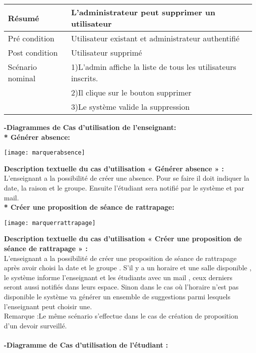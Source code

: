 \documentclass[a4paper,12pt,oneside]{report}
\begin{document}
\begin{center}

\begin{tabular}{|l|l|}
  \hline
  Résumé & L'administrateur peut supprimer un utilisateur \\
  \hline
  Pré condition & Utilisateur existant et administrateur authentifié \\
  \hline
  Post condition & Utilisateur supprimé\\
  \hline
 Scénario nominal & 1)L'admin affiche la liste de tous les utilisateurs inscrits. \\ 
 & 2)Il clique sur le bouton supprimer \\

& 3)Le système valide la suppression\\
 \hline

\end{tabular}
\end{center}

\textbf{ -Diagrammes de Cas d'utilisation de l'enseignant:} \\
\textbf{* Générer absence:}
\begin{center}
\texttt{[image: marquerabsence]}
\label{fig1}
\end{center}
\textbf{Description textuelle du cas d'utilisation « Générer absence » :}\\
L'enseignant a la possibilité de créer une absence. Pour se faire il doit indiquer la date, la raison et le groupe. Ensuite l'étudiant sera notifié par le système et par mail. \\
\textbf{* Créer une proposition de séance de rattrapage:}
\begin{center}
\texttt{[image: marquerrattrapage]}
\label{fig1}
\end{center}
\textbf{Description textuelle du cas d'utilisation « Créer une proposition de séance de rattrapage » :}\\
L'enseignant a la possibilité de créer une proposition de séance de rattrapage après avoir choisi la date et le groupe .
S'il y a un horaire et une salle disponible , le système informe l'enseignant et les étudiants avec un mail , ceux derniers seront aussi notifiés dans leurs espace. Sinon dans le cas où l'horaire n'est pas disponible le système va générer un ensemble de suggestions parmi lesquels l'enseignant peut choisir une.
\\
Remarque :Le même scénario s'effectue dans le cas de création de proposition d'un devoir surveillé.
\\
\\
\textbf{ -Diagramme de Cas d'utilisation de l'étudiant :}
\end{document}

